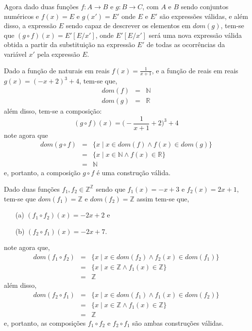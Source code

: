 Agora dado duas funções $f: A \rightarrow B$ e $g: B \rightarrow C$, com $A$ e $B$ sendo conjuntos numéricos e $f(x) = E$ e $g(x') = E'$ onde $E$ e $E'$ são expressões válidas, e além disso, a expressão $E$ sendo capaz de descrever os elementos em $dom(g)$, tem-se que $(g \circ f)(x) = E'[E/x']$, onde $E'[E/x']$ será uma nova expressão válida obtida a partir da substituição na expressão $E'$ de todas as ocorrências da variável $x'$ pela expressão $E$.

\begin{exemplo}\label{exe:ComposicaoFuncao1}
	Dado a função de naturais em reais $f(x) = \frac{1}{x+1}$, e a função de reais em reais $g(x) = (-x + 2)^3 + 4$, tem-se que,
	\begin{eqnarray*}
		dom(f) & = & \mathbb{N}\\
		dom(g) & = & \mathbb{R}
	\end{eqnarray*}
	além disso, tem-se a composição: 
	$$(g \circ f)(x) = \Big(- \frac{1}{x+1} + 2\Big)^3 + 4$$
	note agora que
	\begin{eqnarray*}
		dom(g \circ f) & = & \{x \mid x \in dom(f) \land f(x) \in dom(g)\}\\ 
		& = & \{x \mid x \in \mathbb{N} \land f(x) \in \mathbb{R}\}\\
		& = & \mathbb{N}
	\end{eqnarray*}
	e, portanto, a composição $g \circ f$ é uma construção válida.
\end{exemplo}

\begin{exemplo}\label{exe:ComposicaoFuncao2}
	Dado duas funções $f_1, f_2 \in \mathbb{Z}^{\mathbb{Z}}$ sendo que $f_1(x) = -x + 3$ e $f_2(x) = 2x + 1$, tem-se que $dom(f_1)  =  \mathbb{Z}$ e $dom(f_2)  =  \mathbb{Z}$ assim tem-se que,
	\begin{itemize}
		\item[(a)] $(f_1 \circ f_2)(x) = -2x + 2$ e
		\item[(b)] $(f_2 \circ f_1)(x) = -2x + 7$.
	\end{itemize}
	note agora que,
	\begin{eqnarray*}
		dom(f_1 \circ f_2) & = & \{x \mid x \in dom(f_2) \land f_2(x) \in dom(f_1)\}\\ 
		& = & \{x \mid x \in \mathbb{Z} \land f_1(x) \in \mathbb{Z}\}\\
		& = & \mathbb{Z}
	\end{eqnarray*}
	além disso, 
	\begin{eqnarray*}
		dom(f_2 \circ f_1) & = & \{x \mid x \in dom(f_1) \land f_1(x) \in dom(f_2)\}\\ 
		& = & \{x \mid x \in \mathbb{Z} \land f_1(x) \in \mathbb{Z}\}\\
		& = & \mathbb{Z}
	\end{eqnarray*}
	e, portanto, as composições $f_1 \circ f_2$ e $f_2 \circ f_1$ são ambas construções válidas.
\end{exemplo}

